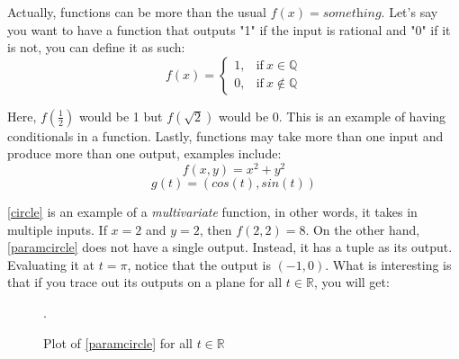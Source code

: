    Actually, functions can be more than the usual \(f(x)=\textit{something}\). Let's say you want to have a function that outputs "1" if the input is rational and "0" if it is not, you can define it as such:
    \begin{equation}
      f(x)=
      \begin{cases}
        1, & \text{if}\ x \in \mathbb{Q} \\
        0, & \text{if}\ x \notin \mathbb{Q}
      \end{cases}
    \end{equation}
   

    Here, \(f(\frac{1}{2})\) would be 1 but \(f(\sqrt{2})\) would be 0. This is an example of having conditionals in a function. Lastly, functions may take more than one input and produce more than one output, examples include:
    \begin{equation}
      f(x,y)=x^2+y^2 
      \label{circle}
    \end{equation}
    \begin{equation}
      \label{paramcircle}
      g(t)=(cos(t), sin(t))
    \end{equation}

      \ref{circle} is an example of a \textit{multivariate} function, in other words, it takes in multiple inputs. If \(x=2\) and \(y=2\), then \(f(2,2)=8\). On the other hand, \ref{paramcircle} does not have a single output. Instead, it has a tuple  as its output. Evaluating it at \(t=\pi\), notice that the output is \((-1, 0)\). What is interesting is that if you trace out its outputs on a plane for all \(t \in \mathbb{R}\), you will get:
    \begin{figure}[h]
  \begin{center}
    \tiny\caption{Plot of \ref{paramcircle} for all \(t \in \mathbb{R}\)}.
  \end{center} 
  \end{figure}

